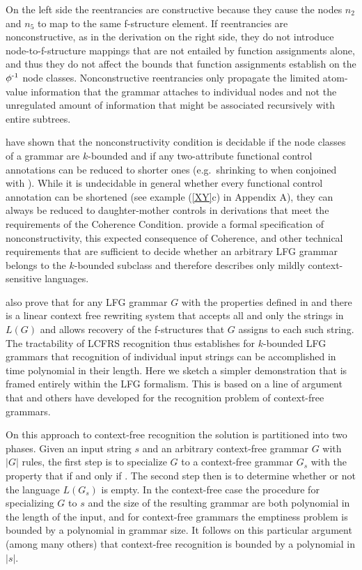 \documentclass[output=paper,hidelinks]{langscibook}
\begin{document}
On the left side the reentrancies are constructive because they cause the nodes \mbox{$n_2$} and  \mbox{$n_5$} to map to the same f-structure element. If reentrancies are nonconstructive, as in the derivation on the right side, they do not introduce node-to-f-structure mappings that are not entailed by function assignments alone, and thus they do not affect the bounds that function assignments establish on the $\mbox{$\phi\textsuperscript{-1}$}$ node classes. Nonconstructive reentrancies only propagate the limited atom-value information that the grammar attaches to individual nodes and not the unregulated amount of information that might be associated recursively with entire subtrees.

 \cite{wed:kap:20} have shown that the nonconstructivity condition  is decidable if the \mb{\phiinv} node classes of a grammar are $k$-bounded and if any two-attribute functional control annotations can be reduced to shorter ones (e.g.\ shrinking  to  when conjoined with ). While it is undecidable in general whether every functional control annotation can be shortened (see example (\ref{XY}c) in Appendix A), they can always be reduced to daughter-mother controls in derivations that meet the requirements of the Coherence Condition.  \cite{wed:kap:20} provide a formal specification of nonconstructivity, this expected consequence of Coherence, and other technical requirements that are sufficient to decide whether an arbitrary LFG grammar belongs to the $k$-bounded subclass and therefore describes only mildly context-sensitive languages.

\cite{wed:kap:20} also prove that for any LFG grammar $G$ with the properties defined in  and  there is a linear context free rewriting system that accepts all and only the strings in $L(G)$ and allows recovery of the f-structures that $G$ assigns to each such string.  The tractability of LCFRS recognition thus establishes for $k$-bounded LFG grammars that recognition of individual input strings can be accomplished in time polynomial in their length.  Here we sketch a simpler demonstration that is framed entirely within the LFG formalism. This is based on a line of argument that \cite{Lang92recognitioncan} and others have developed for the recognition problem of context-free grammars.

On this approach to context-free recognition the solution is partitioned into two phases.  Given an input string $s$ and an arbitrary context-free grammar $G$ with $|G|$ rules, the first step is to specialize $G$ to a context-free grammar $G_s$ with the property that  if and only if  .   The second step then is to determine whether or not the language $L(G_s)$ is empty.  In the context-free case the procedure for specializing $G$ to $s$ and the size of the resulting grammar are both polynomial in the length of the input, and for context-free grammars the emptiness problem is bounded by a polynomial in grammar size.  It follows on this particular argument (among many others) that context-free recognition is bounded by a polynomial in $|s|$. 
\end{document}
